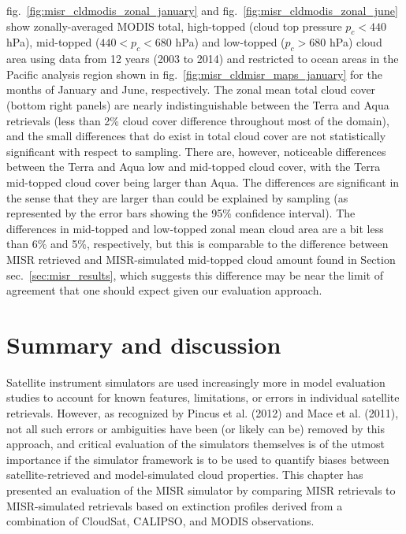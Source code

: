 fig.~\ref{fig:misr_cldmodis_zonal_january} and
fig.~\ref{fig:misr_cldmodis_zonal_june} show zonally-averaged MODIS
total, high-topped (cloud top pressure \(p_c < 440\) hPa), mid-topped
(\(440 < p_c < 680\) hPa) and low-topped (\(p_c > 680\) hPa) cloud area
using data from 12 years (2003 to 2014) and restricted to ocean areas in
the Pacific analysis region shown in
fig.~\ref{fig:misr_cldmisr_maps_january} for the months of January and
June, respectively. The zonal mean total cloud cover (bottom right
panels) are nearly indistinguishable between the Terra and Aqua
retrievals (less than 2\% cloud cover difference throughout most of the
domain), and the small differences that do exist in total cloud cover
are not statistically significant with respect to sampling. There are,
however, noticeable differences between the Terra and Aqua low and
mid-topped cloud cover, with the Terra mid-topped cloud cover being
larger than Aqua. The differences are significant in the sense that they
are larger than could be explained by sampling (as represented by the
error bars showing the 95\% confidence interval). The differences in
mid-topped and low-topped zonal mean cloud area are a bit less than 6\%
and 5\%, respectively, but this is comparable to the difference between
MISR retrieved and MISR-simulated mid-topped cloud amount found in
Section sec.~\ref{sec:misr_results}, which suggests this difference may
be near the limit of agreement that one should expect given our
evaluation approach.

\section{Summary and discussion}\label{sec:misrux5fsummary}

Satellite instrument simulators are used increasingly more in model
evaluation studies to account for known features, limitations, or errors
in individual satellite retrievals. However, as recognized by Pincus et
al. (2012) and Mace et al. (2011), not all such errors or ambiguities
have been (or likely can be) removed by this approach, and critical
evaluation of the simulators themselves is of the utmost importance if
the simulator framework is to be used to quantify biases between
satellite-retrieved and model-simulated cloud properties. This chapter
has presented an evaluation of the MISR simulator by comparing MISR
retrievals to MISR-simulated retrievals based on extinction profiles
derived from a combination of CloudSat, CALIPSO, and MODIS observations.

